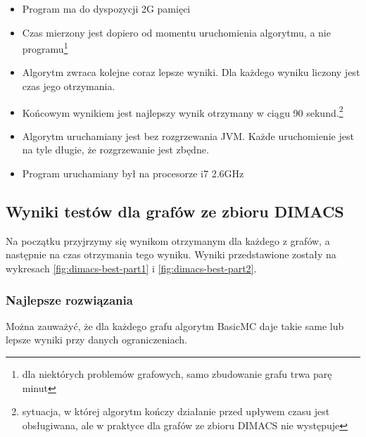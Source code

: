 \documentclass[12pt, a4paper]{article}
\begin{document}
\begin{itemize}
\item Program ma do dyspozycji 2G pamięci
\item Czas mierzony jest dopiero od momentu uruchomienia algorytmu, a nie programu\footnote{dla niektórych problemów grafowych, samo zbudowanie grafu trwa parę minut}
\item Algorytm zwraca kolejne coraz lepsze wyniki. Dla każdego wyniku liczony jest czas jego otrzymania.
\item Końcowym wynikiem jest najlepszy wynik otrzymany w ciągu 90 sekund.\footnote{sytuacja, w której algorytm kończy działanie przed upływem czasu jest obsługiwana, ale w praktyce dla grafów ze zbioru DIMACS nie występuje}
\item Algorytm uruchamiany jest bez rozgrzewania JVM. Każde uruchomienie jest na tyle długie, że rozgrzewanie jest zbędne.
\item Program uruchamiany był na procesorze i7 2.6GHz
\end{itemize}

\subsection{Wyniki testów dla grafów ze zbioru DIMACS}
Na początku przyjrzymy się wynikom otrzymanym dla każdego z grafów, a następnie na czas otrzymania tego wyniku. Wyniki przedstawione zostały na wykresach \ref{fig:dimacs-best-part1} i \ref{fig:dimacs-best-part2}. 

\subsubsection{Najlepsze rozwiązania}
Można zauważyć, że dla każdego grafu algorytm BasicMC daje takie same lub lepsze wyniki przy danych ograniczeniach.
\end{document}

